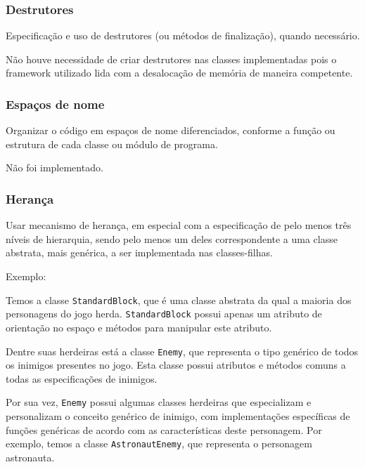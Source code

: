 \documentclass[rel_mlp]{iiufrgs}
\begin{document}

\subsubsection{Destrutores}

Especificação e uso de destrutores (ou métodos de finalização), quando necessário.

Não houve necessidade de criar destrutores nas classes implementadas pois o framework utilizado lida com a desalocação de memória de maneira competente.


\subsubsection{Espaços de nome}

Organizar o código em espaços de nome diferenciados, conforme a função ou estrutura de cada classe ou módulo de programa.

Não foi implementado.


\subsubsection{Herança}

Usar mecanismo de herança, em especial com a especificação de pelo menos três níveis de hierarquia, sendo pelo menos um deles correspondente a uma classe abstrata, mais genérica, a ser implementada nas classes-filhas.

Exemplo:

Temos a classe \texttt{StandardBlock}, que é uma classe abstrata da  qual a maioria dos personagens do jogo herda. \texttt{StandardBlock} possui apenas um atributo de orientação no espaço e métodos para manipular este atributo.

Dentre suas herdeiras está a classe \texttt{Enemy}, que representa o tipo genérico de todos os inimigos presentes no jogo. Esta classe possui atributos e métodos comuns a todas as especificações de inimigos.

Por sua vez, \texttt{Enemy} possui algumas classes herdeiras que especializam e personalizam o conceito genérico de inimigo, com implementações específicas de funções genéricas de acordo com as características deste personagem. Por exemplo, temos a classe \texttt{AstronautEnemy}, que representa o personagem astronauta.
\end{document}
